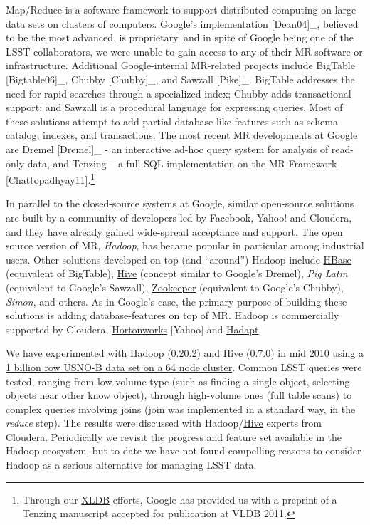 \documentclass[DM,lsstdraft,toc]{lsstdoc}
\begin{document}
Map/Reduce is a software framework to support distributed computing on
large data sets on clusters of computers. Google's implementation
{[}Dean04{]}\_, believed to be the most advanced, is proprietary, and in
spite of Google being one of the LSST collaborators, we were unable to
gain access to any of their MR software or infrastructure. Additional
Google-internal MR-related projects include BigTable {[}Bigtable06{]}\_,
Chubby {[}Chubby{]}\_, and Sawzall {[}Pike{]}\_. BigTable addresses the
need for rapid searches through a specialized index; Chubby adds
transactional support; and Sawzall is a procedural language for
expressing queries. Most of these solutions attempt to add partial
database-like features such as schema catalog, indexes, and
transactions. The most recent MR developments at Google are Dremel
{[}Dremel{]}\_ - an interactive ad-hoc query system for analysis of
read-only data, and Tenzing -- a full SQL implementation on the MR
Framework {[}Chattopadhyay11{]}.\footnote{Through our
  \href{http://xldb.org}{XLDB} efforts, Google has provided us with a
  preprint of a Tenzing manuscript accepted for publication at VLDB
  2011.}

In parallel to the closed-source systems at Google, similar open-source
solutions are built by a community of developers led by Facebook, Yahoo!
and Cloudera, and they have already gained wide-spread acceptance and
support. The open source version of MR, \emph{Hadoop}, has became
popular in particular among industrial users. Other solutions developed
on top (and ``around'') Hadoop include
\href{http://hadoop.apache.org/hbase/}{HBase} (equivalent of BigTable),
\href{http://wiki.apache.org/hadoop/Hive}{Hive} (concept similar to
Google's Dremel), \emph{Pig Latin} (equivalent to Google's Sawzall),
\href{website:\%20http://zookeeper.sourceforge.net/}{Zookeeper}
(equivalent to Google's Chubby), \emph{Simon}, and others. As in
Google's case, the primary purpose of building these solutions is adding
database-features on top of MR. Hadoop is commercially supported by
Cloudera, \href{http://www.hortonworks.com/}{Hortonworks} {[}Yahoo{]}
and \href{http://hadapt.com}{Hadapt}.

We have
\href{http://dev.lsstcorp.org/trac/wiki/db\%60Hive\%60_Experiment}{experimented
with Hadoop (0.20.2) and Hive (0.7.0) in mid 2010 using a 1 billion row
USNO-B data set on a 64 node cluster}. Common LSST queries were tested,
ranging from low-volume type (such as finding a single object, selecting
objects near other know object), through high-volume ones (full table
scans) to complex queries involving joins (join was implemented in a
standard way, in the \emph{reduce} step). The results were discussed
with Hadoop/\href{http://wiki.apache.org/hadoop/Hive}{Hive} experts from
Cloudera. Periodically we revisit the progress and feature set available
in the Hadoop ecosystem, but to date we have not found compelling
reasons to consider Hadoop as a serious alternative for managing LSST
data.
\end{document}
